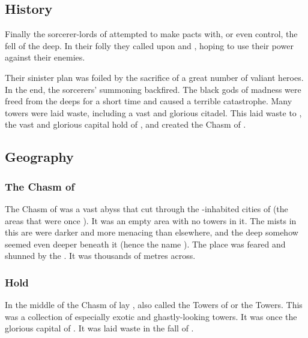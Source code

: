 \subsection{History}
Finally the sorcerer-lords of \Tarcharos attempted to make pacts with, or even control, the fell  of the deep. 
In their folly they called upon \Norganthus and \Tzyaragoth, hoping to use their power against their enemies. 

Their sinister plan was foiled by the sacrifice of a great number of valiant heroes.
In the end, the sorcerers' summoning backfired.
The black gods of madness were freed from the deeps for a short time and caused a terrible catastrophe.
Many towers were laid waste, including a vast and glorious citadel. 
This laid waste to \Hyardes, the vast and glorious capital hold of \Tarcharos, and created the Chasm of .









\subsection{Geography}





\subsubsection{The Chasm of \Oggra}
\index{\Oggra}
The Chasm of \Oggra was a vast abyss that cut through the \resphan-inhabited cities of \Nyx (the areas that were once \Merkyrah). 
It was an empty area with no towers in it.
The mists in this are were darker and more menacing than elsewhere, and the deep somehow seemed even deeper beneath it (hence the name ). 
The place was feared and shunned by the \resphain. 
It was thousands of metres across. 





\subsubsection{\Hyardes Hold}
\index{\Carcosa}
\index{\Hyardes}
In the middle of the Chasm of \Oggra lay \Carcosa, also called the Towers of \Hyardes or the \Hyardes Towers. 
This was a collection of especially exotic and ghastly-looking towers. 
It was once the glorious capital of \Tarcharos.
It was laid waste in the fall of \Tarcharos.

